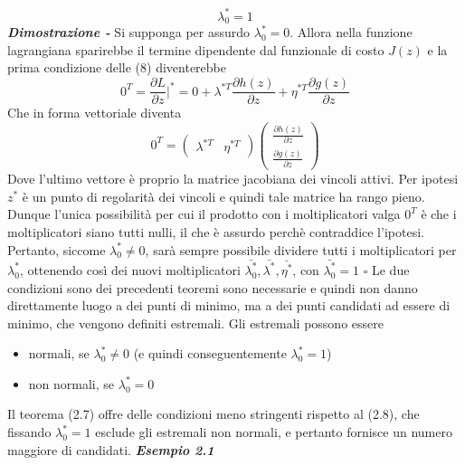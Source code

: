 \documentclass{article}
\begin{document}
\begin{equation}
    \lambda_0^* = 1
\end{equation}
\textbf{\textit{Dimostrazione -}} Si supponga per assurdo $\lambda_0^* = 0$. Allora nella funzione lagrangiana sparirebbe il termine dipendente dal funzionale di costo $J(z)$ e la prima condizione delle (8) diventerebbe
\begin{equation}
    0^T = \frac{\partial L}{\partial z}\big\rvert^* = 0 + \lambda^{*T} \frac{\partial h(z)}{\partial z} + \eta^{*T} \frac{\partial g(z)}{\partial z}
\end{equation} 
Che in forma vettoriale diventa
\begin{equation}
    0^T = 
    \begin{pmatrix}
        \lambda^{*T} & \eta^{*T}
    \end{pmatrix}
    \begin{pmatrix}
        \frac{\partial h(z)}{\partial z} \\
        \frac{\partial g(z)}{\partial z}
    \end{pmatrix}
\end{equation}
Dove l'ultimo vettore è proprio la matrice jacobiana dei vincoli attivi. Per ipotesi $z^*$ è un punto di regolarità dei vincoli e quindi tale matrice ha rango pieno. Dunque l'unica possibilità per cui il prodotto con i moltiplicatori valga $0^T$ è che i moltiplicatori siano tutti nulli, il che è assurdo perchè contraddice l'ipotesi. Pertanto, siccome $\lambda_0^* \neq 0$, sarà sempre possibile dividere tutti i moltiplicatori per $\lambda_0^*$, ottenendo così dei nuovi moltiplicatori $\bar{\lambda_0^*}, \bar{\lambda^*}, \bar{\eta^*}$, con $\bar{\lambda_0^*} = 1$
\nobreak 
\hfill
$\square$
Le due condizioni sono dei precedenti teoremi sono necessarie e quindi non danno direttamente luogo a dei punti di minimo, ma a dei punti candidati ad essere di minimo, che vengono definiti estremali. Gli estremali possono essere 
\begin{itemize}
    \item normali, se $\lambda_0^* \neq 0$ (e quindi conseguentemente $\lambda_0^* = 1$)
    \item non normali, se $\lambda_0^* = 0$ 
\end{itemize} 
Il teorema (2.7) offre delle condizioni meno stringenti rispetto al (2.8), che fissando $\lambda_0^* = 1$ esclude gli estremali non normali, e pertanto fornisce un numero maggiore di candidati.
\medskip
\newline
\textbf{\textit{Esempio 2.1}} 
\nobreak 
\end{document}
